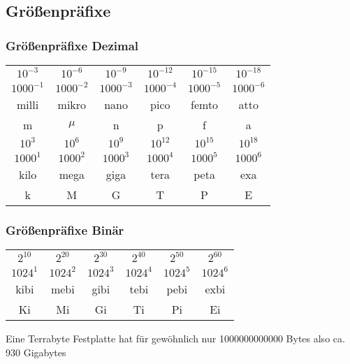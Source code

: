 \documentclass{beamer}
\begin{document}
\subsection{Größenpr\"afixe}
\begin{frame}
	\frametitle{Größenpr\"afixe Dezimal}
	\begin{center}
  		\begin{tabular}{*{6}{c}}
  			\hline
   			$10^{-3}$ & $10^{-6}$ & $10^{-9}$ & $10^{-12}$ & 						$10^{-15}$ & $10^{-18}$ \\
    		$1000^{-1}$ & $1000^{-2}$ & $1000^{-3}$ & $1000^{-4}$ 					& $1000^{-5}$ & $1000^{-6}$ \\
    		milli & mikro & nano & pico & femto & atto \\
    		m & $\mu$ & n & p & f & a \\
    		\hline
    		$10^3$ & $10^6$ & $10^9$ & $10^{12}$ & $10^{15}$ & 						$10^{18}$ \\
    		$1000^1$ & $1000^2$ & $1000^3$ & $1000^4$ & $1000^5$ 					& $1000^6$ \\
    		kilo & mega & giga & tera & peta & exa \\
   			k & M & G & T & P & E \\
   			\hline
  		\end{tabular}
	\end{center}
\end{frame}

\begin{frame}
	\frametitle{Größenpr\"afixe Bin\"ar}
	\begin{center}
  		\begin{tabular}{*{6}{c}}
   			\hline
    		$2^{10}$ & $2^{20}$ & $2^{30}$ & $2^{40}$ & $2^{50}$ & 					$2^{60}$ \\
    		$1024^1$ & $1024^2$ & $1024^3$ & $1024^4$ & $1024^5$ & 					$1024^6$ \\
    		kibi & mebi & gibi & tebi & pebi & exbi \\
    		Ki	& Mi & Gi & Ti & Pi & Ei\\
    		\hline
  		\end{tabular}
	\end{center}
	Eine Terrabyte Festplatte hat für gewöhnlich nur 1000000000000 			Bytes also ca. 930 Gigabytes
\end{frame}
\end{document}
